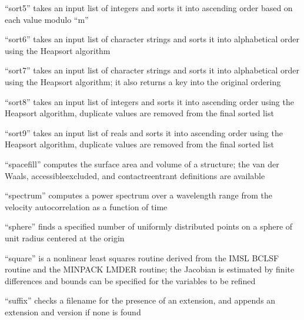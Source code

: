 \documentclass[letterpaper,11pt,english]{sphinxmanual}
\begin{document}
“sort5” takes an input list of integers and sorts it
into ascending order based on each value modulo “m”


“sort6” takes an input list of character strings and sorts
it into alphabetical order using the Heapsort algorithm


“sort7” takes an input list of character strings and sorts it
into alphabetical order using the Heapsort algorithm; it also
returns a key into the original ordering


“sort8” takes an input list of integers and sorts it into
ascending order using the Heapsort algorithm, duplicate
values are removed from the final sorted list


“sort9” takes an input list of reals and sorts it into
ascending order using the Heapsort algorithm, duplicate
values are removed from the final sorted list


“spacefill” computes the surface area and volume of
a structure; the van der Waals, accessible\sphinxhyphen{}excluded,
and contact\sphinxhyphen{}reentrant definitions are available


“spectrum” computes a power spectrum over a wavelength range
from the velocity autocorrelation as a function of time


“sphere” finds a specified number of uniformly distributed
points on a sphere of unit radius centered at the origin


“square” is a nonlinear least squares routine derived from the
IMSL BCLSF routine and the MINPACK LMDER routine; the Jacobian
is estimated by finite differences and bounds can be specified
for the variables to be refined


“suffix” checks a filename for the presence of an extension,
and appends an extension and version if none is found

\end{document}
